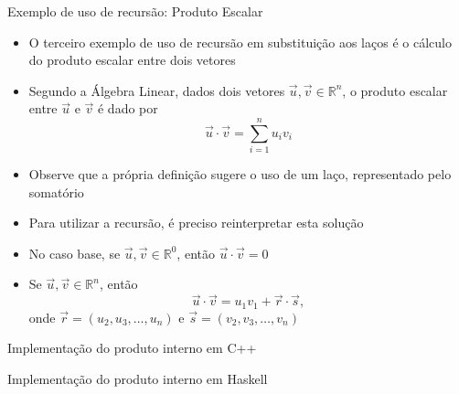 \begin{frame}[fragile]{Exemplo de uso de recursão: Produto Escalar}

    \begin{itemize}
        \item O terceiro exemplo de uso de recursão em substituição aos laços é o cálculo do
            produto escalar entre dois vetores

        \item Segundo a Álgebra Linear, dados dois vetores $\vec{u}, \vec{v}\in \mathbb{R}^n$,
            o produto escalar entre $\vec{u}$ e $\vec{v}$ é dado por
        \[
            \vec{u}\cdot \vec{v} = \sum_{i = 1}^n u_iv_i
        \]

        \item Observe que a própria definição sugere o uso de um laço, representado pelo 
            somatório

        \item Para utilizar a recursão, é preciso reinterpretar esta solução

        \item No caso base, se $\vec{u}, \vec{v}\in \mathbb{R}^0$, então $\vec{u}\cdot\vec{v} = 0$

        \item Se  $\vec{u}, \vec{v}\in\mathbb{R}^n$, então
        \[
            \vec{u}\cdot\vec{v} = u_1v_1 + \vec{r}\cdot\vec{s},
        \]
        onde $\vec{r} = (u_2, u_3, \ldots, u_n)$ e $\vec{s} = (v_2, v_3, \ldots, v_n)$
    \end{itemize}

\end{frame}

\begin{frame}[fragile]{Implementação do produto interno em C++}
\end{frame}

\begin{frame}[fragile]{Implementação do produto interno em Haskell}
\end{frame}

